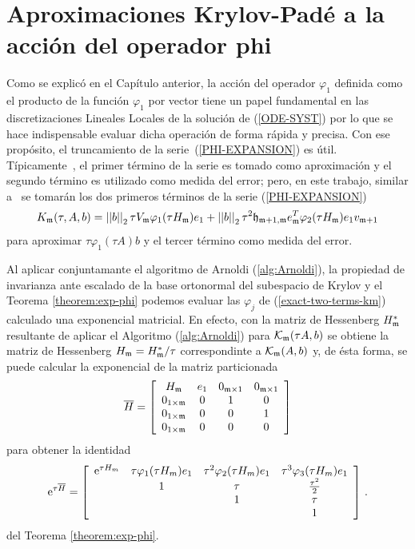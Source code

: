 \section{Aproximaciones Krylov-Padé a la acción del operador phi}\label{section:krylov-pade-approx}

Como se explicó en el Capítulo anterior, la acción del operador $\varphi_1$ definida como el producto de la función $\varphi_1$ por vector tiene un papel fundamental en las discretizaciones Lineales Locales de la solución de (\ref{ODE-SYST}) por lo que se hace indispensable evaluar dicha operación de forma rápida y precisa. Con ese propósito, el truncamiento de la serie~(\ref{PHI-EXPANSION}) es útil. Típicamente~\cite{niesen2012algorithm,sidje1998expokit,tokman2006efficient}, el primer término de la serie es tomado como aproximación y el segundo término es utilizado como medida del error; pero, en este trabajo, similar a~\cite{Saad92} se tomarán los dos primeros términos de la serie (\ref{PHI-EXPANSION})
 \begin{equation}\label{exact-two-terms-km}
    K_{\mathfrak{m}}(\tau,A,b) = \left\lvert \left\lvert  b  \right\rvert \right\rvert_2\tau V_{\mathfrak{m}}\varphi_1(\tau H_{\mathfrak{m}})e_1 + \left\lvert \left\lvert  b  \right\rvert \right\rvert_2\tau^2\mathfrak{h}_{\mathfrak{m}+1,\mathfrak{m}}e^T_{\mathfrak{m}}\varphi_2(\tau H_{\mathfrak{m}})e_1v_{\mathfrak{m}+1}
 \end{equation}
para aproximar $\tau\varphi_1(\tau A)b$ y el tercer término como medida del error.

Al aplicar conjuntamante el algoritmo de Arnoldi (\ref{alg:Arnoldi}), la propiedad de invarianza ante escalado de la base ortonormal del subespacio de Krylov y el Teorema \ref{theorem:exp-phi} podemos evaluar las $\varphi_j$ de (\ref{exact-two-terms-km}) calculado una exponencial matricial. En efecto, con la matriz de Hessenberg $H^*_{\mathfrak{m}}$ resultante de aplicar el Algoritmo (\ref{alg:Arnoldi}) para $\mathcal{K}_{\mathfrak{m}}(\tau A,b)$ se obtiene la matriz de Hessenberg $H_{\mathfrak{m}}=H^*_{\mathfrak{m}}/\tau$ correspondinte a $\mathcal{K}_{\mathfrak{m}}(A,b)$ y, de ésta forma, se puede calcular la exponencial de la matriz particionada
\begin{equation*}
    \overline{H} = \left[\begin{array}{cccc}
    H_{\mathfrak{m}} & e_1 & 0_{\mathfrak{m}\times 1} & 0_{\mathfrak{m}\times 1}\\
    0_{1\times\mathfrak{m}} & 0 & 1 & 0\\
    0_{1\times\mathfrak{m}} & 0 & 0 & 1\\
    0_{1\times\mathfrak{m}} & 0 & 0 & 0
    \end{array}\right] \label{hhat_hessenberg_matrix}
    \end{equation*}
para obtener la identidad  
\begin{equation}
    \mathrm{e}^{\tau\overline{H}} = \left[\begin{array}{cccc}
    \mathrm{e}^{\tau H_m} & \tau\varphi_1(\tau H_m)e_1 & \tau^{2}\varphi_2(\tau H_m)e_1 &
    \tau^{3}\varphi_3(\tau H_m)e_1 \\
    & 1 & \tau & \frac{\tau^{2}}{2}\\
    &  & 1 & \tau \\
    &   &   & 1 \\
    \end{array}\right] \,. \label{phi_hhat_exponential}
\end{equation}
del Teorema \ref{theorem:exp-phi}.

